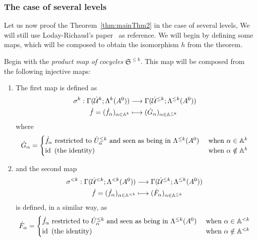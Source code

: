 \subsubsection{The case of several levels}
Let us now proof the Theorem~\ref{thm:mainThm2} in the case of several levels,
We will still use Loday-Richaud's paper~\cite{Loday1994} as reference.
We will begin by defining some maps, which will be composed to obtain the
isomorphism $h$ from the theorem.
\begin{defn}\label{defn:firstSetOfInlusions}
  Begin with the \emph{product map of cocycles} $\mathfrak{S}^{\leq k}$.
  This map will be composed from the following injective maps:
  \begin{enumerate}
    \item The first map is defined as
      \begin{align*}
        \sigma^k:\Gamma(\dot{\mathcal{U}}^k;\Lambda^k(A^0))
        &\longrightarrow \Gamma(\dot{\mathcal{U}}^{\leq k};\Lambda^{\leq k}(A^0))
      \\\dot f=(\dot f_\alpha)_{\alpha\in\mathbb{A}^k}
        &\longmapsto (\dot G_\alpha)_{\alpha\in\mathbb{A}^{\leq k}}
      \end{align*}
      where
      \[
        \dot G_\alpha=\begin{cases}
          \dot f_\alpha \text{~restricted to } \dot U_\alpha^{\leq k}
          \text{~and seen as being in } \Lambda^{\leq k}(A^0)
          & \text{~when } \alpha\in\mathbb{A}^k
        \\\operatorname{id} \text{~(the identity) }
          & \text{~when } \alpha\notin\mathbb{A}^k
        \end{cases}
      \]
    \item and the second map
      \begin{align*}
        \sigma^{<k}:\Gamma(\dot{\mathcal{U}}^{<k};\Lambda^{<k}(A^0))
        &\longrightarrow \Gamma(\dot{\mathcal{U}}^{\leq k};\Lambda^{\leq k}(A^0))
      \\\dot f=(\dot f_\alpha)_{\alpha\in\mathbb{A}^{<k}}
        &\longmapsto (\dot F_\alpha)_{\alpha\in\mathbb{A}^{\leq k}}
      \end{align*}
      is defined, in a similar way, as
      \[
        \dot F_\alpha=\begin{cases}
          \dot f_\alpha \text{~restricted to } \dot U_\alpha^{\leq k}
          \text{~and seen as being in } \Lambda^{\leq k}(A^0)
          & \text{~when } \alpha\in\mathbb{A}^{<k}
        \\\operatorname{id} \text{~(the identity) }
          & \text{~when } \alpha\notin\mathbb{A}^{<k}

\end{cases}\]
\end{enumerate}
\end{defn}
